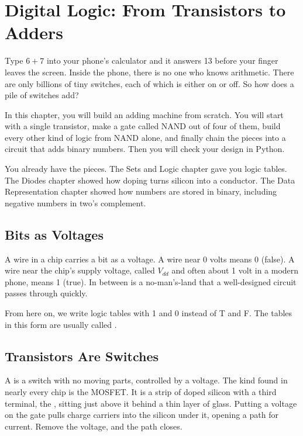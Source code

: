 \chapter{Digital Logic: From Transistors to Adders}

Type $6+7$ into your phone's calculator and it answers 13 before your finger leaves the screen. Inside
the phone, there is no one who knows arithmetic. There are only billions of tiny switches, each of
which is either on or off. So how does a pile of switches add?

In this chapter, you will build an adding machine from scratch. You will start with a single
transistor, make a gate called NAND out of four of them, build every other kind of logic from NAND
alone, and finally chain the pieces into a circuit that adds binary numbers. Then you will check your
design in Python.

You already have the pieces. The Sets and Logic chapter gave you logic tables. The Diodes chapter
showed how doping turns silicon into a conductor. The Data Representation chapter showed how numbers
are stored in binary, including negative numbers in two's complement.

\section{Bits as Voltages}
A wire in a chip carries a bit as a voltage. A wire near 0 volts means 0 (false). A wire near the
chip's supply voltage, called $V_{dd}$ and often about 1 volt in a modern phone, means 1 (true). In
between is a no-man's-land that a well-designed circuit passes through quickly.

From here on, we write logic tables with 1 and 0 instead of T and F. The tables in this form are
usually called .

\section{Transistors Are Switches}
A  is a switch with no moving parts, controlled by a voltage. The kind found in
nearly every chip is the MOSFET. It is a strip of doped silicon with a third terminal, the
, sitting just above it behind a thin layer of glass. Putting a voltage on the gate pulls
charge carriers into the silicon under it, opening a path for current. Remove the voltage, and the
path closes.

